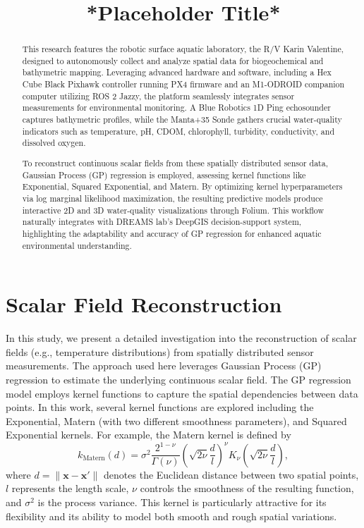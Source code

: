 \documentclass[conference]{IEEEtran}
\title{*Placeholder Title*}
\author{
\IEEEauthorblockN{Rodney Staggers JR \IEEEauthorrefmark{1}, Bharath Vedantha Desikan\IEEEauthorrefmark{1}}
\IEEEauthorblockA{\IEEEauthorrefmark{1}Arizona State University, Tempe, AZ, USA \\
Email: rdstagge@asu.edu, bvedant1@asu.edu}
}
\begin{document}
\maketitle

\begin{abstract}
    This research features the robotic surface aquatic laboratory, the R/V Karin Valentine, designed
    to autonomously collect and analyze spatial data for biogeochemical and bathymetric mapping.
    Leveraging advanced hardware and software, including a Hex Cube Black Pixhawk controller
    running PX4 firmware and an M1-ODROID companion computer utilizing ROS 2 Jazzy, the platform
    seamlessly integrates sensor measurements for environmental monitoring. A Blue Robotics 1D
    Ping echosounder captures bathymetric profiles, while the Manta+35 Sonde gathers crucial
    water-quality indicators such as temperature, pH, CDOM, chlorophyll, turbidity, conductivity,
    and dissolved oxygen.

    To reconstruct continuous scalar fields from these spatially distributed sensor data, Gaussian Process
    (GP) regression is employed, assessing kernel functions like Exponential, Squared Exponential, and
    Matern. By optimizing kernel hyperparameters via log marginal likelihood maximization, the
    resulting predictive models produce interactive 2D and 3D water-quality visualizations through
    Folium. This workflow naturally integrates with DREAMS lab’s DeepGIS decision-support system,
    highlighting the adaptability and accuracy of GP regression for enhanced aquatic environmental
    understanding.

\end{abstract}
\section{Scalar Field Reconstruction}

    In this study, we present a detailed investigation into the reconstruction of scalar fields (e.g., temperature distributions) from spatially distributed sensor measurements. 
    The approach used here leverages Gaussian Process (GP) regression to estimate the underlying continuous scalar field. 
    The GP regression model employs kernel functions to capture the spatial dependencies between data points. 
    In this work, several kernel functions are explored including the Exponential, Matern (with two different smoothness parameters), and Squared Exponential kernels. 
    For example, the Matern kernel is defined by
\begin{equation}
    k_{\text{Matern}}(d) = \sigma^2 \frac{2^{1-\nu}}{\Gamma(\nu)}
    \left(\sqrt{2\nu}\frac{d}{l}\right)^{\nu} K_{\nu}\left(\sqrt{2\nu}\frac{d}{l}\right),
\end{equation}
    where \( d = \|\mathbf{x}-\mathbf{x}'\| \) denotes the Euclidean distance between two spatial points, \( l \) represents the length scale, \( \nu \) controls the smoothness of the resulting function, 
    and \( \sigma^2 \) is the process variance. This kernel is particularly attractive for its flexibility and its ability to model both smooth and rough spatial variations.
\end{document}
